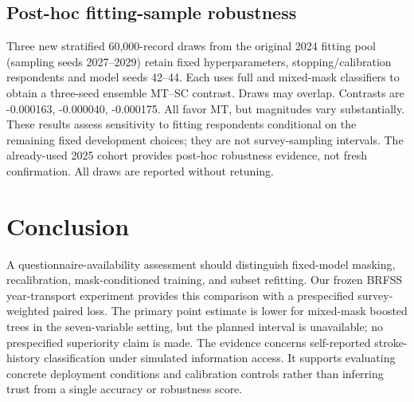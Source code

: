 \documentclass[conference,letterpaper]{IEEEtran}
\begin{document}
\subsection{Post-hoc fitting-sample robustness}Three new stratified 60,000-record draws from the original 2024 fitting pool (sampling seeds 2027--2029) retain fixed hyperparameters, stopping/calibration respondents and model seeds 42--44. Each uses full and mixed-mask classifiers to obtain a three-seed ensemble MT--SC contrast. Draws may overlap. Contrasts are -0.000163, -0.000040, -0.000175. All favor MT, but magnitudes vary substantially. These results assess sensitivity to fitting respondents conditional on the remaining fixed development choices; they are not survey-sampling intervals. The already-used 2025 cohort provides post-hoc robustness evidence, not fresh confirmation. All draws are reported without retuning.
\section{Conclusion}
A questionnaire-availability assessment should distinguish fixed-model masking, recalibration, mask-conditioned training, and subset refitting. Our frozen BRFSS year-transport experiment provides this comparison with a prespecified survey-weighted paired loss. The primary point estimate is lower for mixed-mask boosted trees in the seven-variable setting, but the planned interval is unavailable; no prespecified superiority claim is made. The evidence concerns self-reported stroke-history classification under simulated information access. It supports evaluating concrete deployment conditions and calibration controls rather than inferring trust from a single accuracy or robustness score.

\balance
\end{document}

